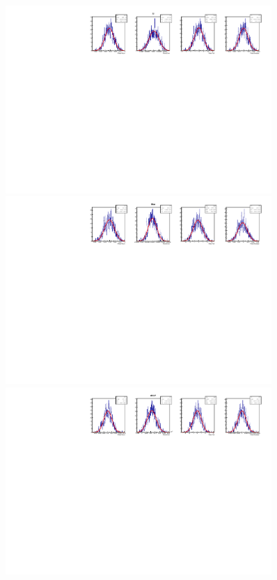 \begin{figure}[t]
        \begin{center}
                \includegraphics[width=0.9\textwidth]{AA-Appdx-toytagger/figs/1DPullPlot_Sf_SSbarAccAsymmFloatDMGammaConstrAllSamplesToyTagger.pdf} \\
                \includegraphics[width=0.9\textwidth]{AA-Appdx-toytagger/figs/1DPullPlot_Sfbar_SSbarAccAsymmFloatDMGammaConstrAllSamplesToyTagger.pdf} \\
                \includegraphics[width=0.9\textwidth]{AA-Appdx-toytagger/figs/1DPullPlot_deltaM_SSbarAccAsymmFloatDMGammaConstrAllSamplesToyTagger.pdf} \\

\end{center}
\end{figure}
